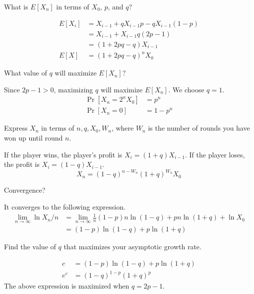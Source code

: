 \documentclass[11pt]{article}
\begin{document}
\newpage
{}

\begin{Parts}
    
    \Part What is $E[X_n]$ in terms of $X_0$, $p$, and $q$?
    \begin{Answer}
        \begin{align*}
            E[X_i] &= X_{i-1} + qX_{i-1}p - qX_{i-1}(1-p) \\ 
                   &= X_{i-1} + X_{i-1} q(2p-1) \\
                   &= (1 + 2pq - q) X_{i-1} \\
            E[X]   &= (1 + 2pq - q)^n X_0
        \end{align*}
    \end{Answer}

    \Part What value of $q$ will maximize $E[X_n]$?
    \begin{Answer}
        Since $2p - 1 > 0$, maximizing $q$ will maximize $E[X_n]$. We choose $q = 1$. 
        \begin{align*}
            \Pr[X_n = 2^n X_0] &= p^n \\
            \Pr[X_n = 0]       &= 1 - p^n
        \end{align*}
    \end{Answer}

    \Part Express $X_n$ in terms of $n,q,X_0,W_n$, where $W_n$ is the number of rounds you have won up until round $n$.
    \begin{Answer}
        If the player wins, the player's profit is $X_i = (1+q)X_{i-1}$. If the player loses, the profit is $X_i = (1-q)X_{i-1}$. 
        $$X_n = (1-q)^{n - W_n}(1+q)^{W_n}X_0$$
    \end{Answer}

    \Part Convergence? 
    \begin{Answer}
        It converges to the following expression. 
        \begin{align*}
            \lim_{n \to \infty} \ln X_n / n &= \lim_{n \to \infty} \frac{1}{n} (1-p)n \ln (1-q) + pn \ln (1+q) + \ln X_0 \\
                                            &= (1-p) \ln (1-q) + p \ln(1+q)
        \end{align*}
    \end{Answer}

    \newpage
    \Part Find the value of $q$ that maximizes your asymptotic growth rate. 
    \begin{Answer}
        \begin{align*}
            c   &= (1-p) \ln (1-q) + p \ln(1+q) \\
            e^c &= (1-q)^{1-p}(1+q)^p
        \end{align*}
        The above expression is maximized when $q = 2p - 1$. 
    \end{Answer}


\end{Parts}
\end{document}
